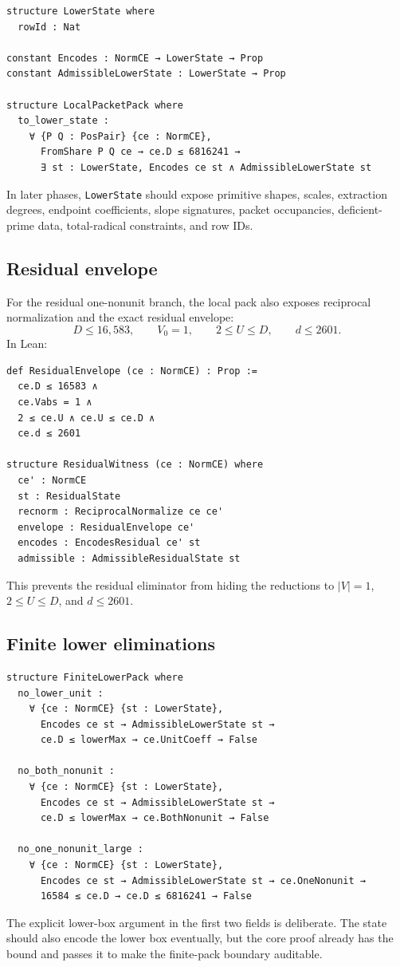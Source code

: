\documentclass[11pt]{article}
\begin{document}
\begin{lstlisting}[language={}]
structure LowerState where
  rowId : Nat

constant Encodes : NormCE → LowerState → Prop
constant AdmissibleLowerState : LowerState → Prop

structure LocalPacketPack where
  to_lower_state :
    ∀ {P Q : PosPair} {ce : NormCE},
      FromShare P Q ce → ce.D ≤ 6816241 →
      ∃ st : LowerState, Encodes ce st ∧ AdmissibleLowerState st
\end{lstlisting}
In later phases, \verb|LowerState| should expose primitive shapes, scales,
extraction degrees, endpoint coefficients, slope signatures, packet
occupancies, deficient-prime data, total-radical constraints, and row IDs.

\subsection{Residual envelope}

For the residual one-nonunit branch, the local pack also exposes reciprocal
normalization and the exact residual envelope:
\[
D\leq16{,}583,
\qquad
V_0=1,
\qquad
2\leq U\leq D,
\qquad
d\leq2601.
\]
In Lean:
\begin{lstlisting}[language={}]
def ResidualEnvelope (ce : NormCE) : Prop :=
  ce.D ≤ 16583 ∧
  ce.Vabs = 1 ∧
  2 ≤ ce.U ∧ ce.U ≤ ce.D ∧
  ce.d ≤ 2601

structure ResidualWitness (ce : NormCE) where
  ce' : NormCE
  st : ResidualState
  recnorm : ReciprocalNormalize ce ce'
  envelope : ResidualEnvelope ce'
  encodes : EncodesResidual ce' st
  admissible : AdmissibleResidualState st
\end{lstlisting}
This prevents the residual eliminator from hiding the reductions to $|V|=1$,
$2\leq U\leq D$, and $d\leq2601$.

\subsection{Finite lower eliminations}

\begin{lstlisting}[language={}]
structure FiniteLowerPack where
  no_lower_unit :
    ∀ {ce : NormCE} {st : LowerState},
      Encodes ce st → AdmissibleLowerState st →
      ce.D ≤ lowerMax → ce.UnitCoeff → False

  no_both_nonunit :
    ∀ {ce : NormCE} {st : LowerState},
      Encodes ce st → AdmissibleLowerState st →
      ce.D ≤ lowerMax → ce.BothNonunit → False

  no_one_nonunit_large :
    ∀ {ce : NormCE} {st : LowerState},
      Encodes ce st → AdmissibleLowerState st → ce.OneNonunit →
      16584 ≤ ce.D → ce.D ≤ 6816241 → False
\end{lstlisting}
The explicit lower-box argument in the first two fields is deliberate.  The
state should also encode the lower box eventually, but the core proof already
has the bound and passes it to make the finite-pack boundary auditable.
\end{document}
